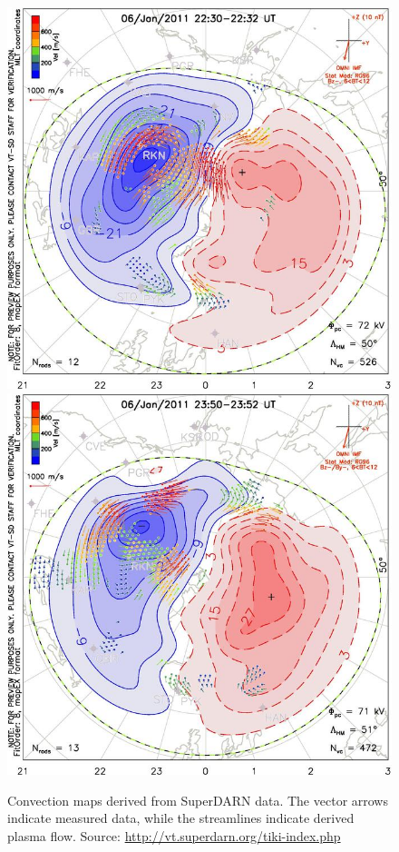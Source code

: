\documentclass[norsk,a4paper,11pt]{article}
\begin{document}
\begin{multicols}{2}
\begin{figure}[H]
	\includegraphics[scale = 0.9]{Figures/Superdarn/superdarn_22_32.jpg}
	\includegraphics[scale = 0.9]{Figures/Superdarn/superdarn_23_52.jpg}
	\centering
	\caption{Convection maps derived from SuperDARN data. The vector arrows indicate measured data, while the streamlines indicate derived plasma flow. Source: \url{http://vt.superdarn.org/tiki-index.php}}
	\label{fig:superdarn_data}
\end{figure}


\end{multicols}
\end{document}
